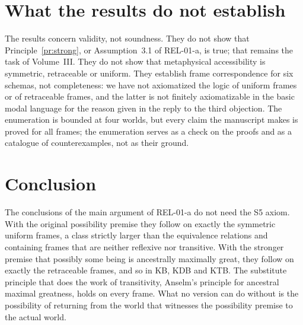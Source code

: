 \documentclass{situationist-preprint}
\begin{document}
\section{What the results do not establish}\label{s:not}

The results concern validity, not soundness. They do not show that Principle~\ref{pr:strong}, or Assumption~3.1 of REL-01-a, is true; that remains the task of Volume~III. They do not show that metaphysical accessibility is symmetric, retraceable or uniform. They establish frame correspondence for six schemas, not completeness: we have not axiomatized the logic of uniform frames or of retraceable frames, and the latter is not finitely axiomatizable in the basic modal language for the reason given in the reply to the third objection. The enumeration is bounded at four worlds, but every claim the manuscript makes is proved for all frames; the enumeration serves as a check on the proofs and as a catalogue of counterexamples, not as their ground.

\section{Conclusion}

The conclusions of the main argument of REL-01-a do not need the S5 axiom. With the original possibility premise they follow on exactly the symmetric uniform frames, a class strictly larger than the equivalence relations and containing frames that are neither reflexive nor transitive. With the stronger premise that possibly some being is ancestrally maximally great, they follow on exactly the retraceable frames, and so in KB, KDB and KTB. The substitute principle that does the work of transitivity, Anselm's principle for ancestral maximal greatness, holds on every frame. What no version can do without is the possibility of returning from the world that witnesses the possibility premise to the actual world.
\end{document}
